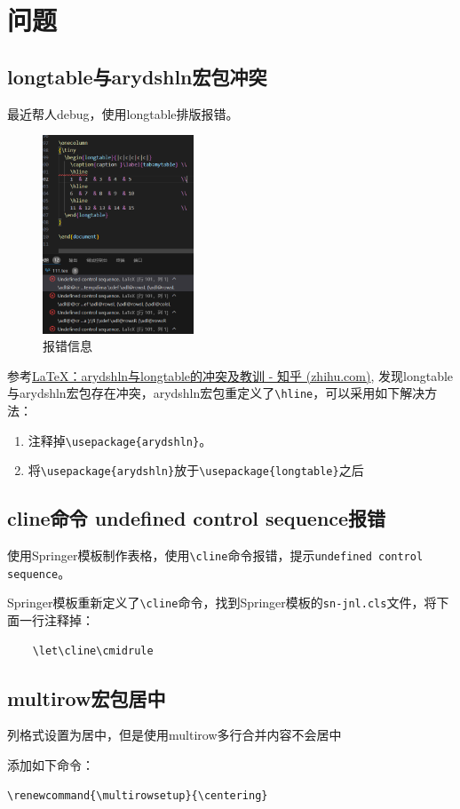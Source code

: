 \section{问题}

\subsection{longtable与arydshln宏包冲突}\label{subsec:longtable-arydshln-conflict}
最近帮人debug，使用longtable排版报错。
\begin{figure}[!h]
    \centering
    \includegraphics[width=0.4\textwidth]{figure/chap-tab/ary1.png}
    \caption{报错信息}
\end{figure}

参考\href{https://zhuanlan.zhihu.com/p/667681242}{LaTeX：arydshln与longtable的冲突及教训 - 知乎 (zhihu.com)}, 发现longtable与arydshln宏包存在冲突，arydshln宏包重定义了\lstinline{\hline}，可以采用如下解决方法：
\begin{enumerate}
    \item 注释掉\lstinline|\usepackage{arydshln}|。
    \item 将\lstinline|\usepackage{arydshln}|放于\lstinline|\usepackage{longtable}|之后
\end{enumerate}

\subsection{cline命令 undefined control sequence报错}\label{subsec:cline-undefined-control-sequence-error}
使用Springer模板制作表格，使用\lstinline{\cline}命令报错，提示\lstinline{undefined control sequence}。

Springer模板重新定义了\lstinline{\cline}命令，找到Springer模板的\lstinline{sn-jnl.cls}文件，将下面一行注释掉：
\begin{lstlisting}
    \let\cline\cmidrule
\end{lstlisting}

\subsection{multirow宏包居中}\label{subsec:multirow-center}

列格式设置为居中，但是使用multirow多行合并内容不会居中

添加如下命令：
\begin{lstlisting}
\renewcommand{\multirowsetup}{\centering}
\end{lstlisting}
